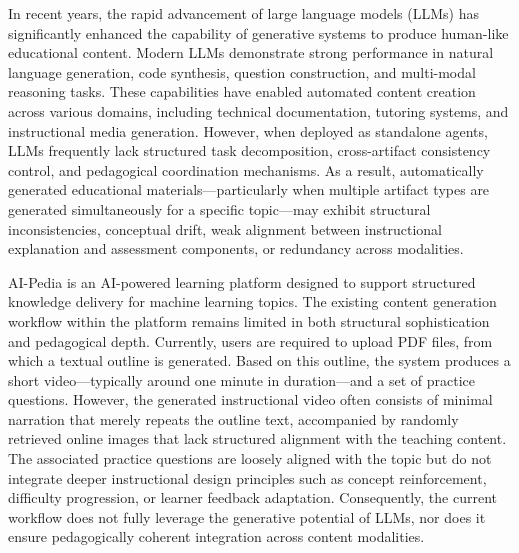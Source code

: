 \documentclass[10pt,journal,compsoc]{IEEEtran}
\begin{document}
\IEEEdisplaynontitleabstractindextext
\IEEEpeerreviewmaketitle

In recent years, the rapid advancement of large language models (LLMs) has significantly enhanced the capability of generative systems to produce human-like educational content. Modern LLMs demonstrate strong performance in natural language generation, code synthesis, question construction, and multi-modal reasoning tasks. These capabilities have enabled automated content creation across various domains, including technical documentation, tutoring systems, and instructional media generation. However, when deployed as standalone agents, LLMs frequently lack structured task decomposition, cross-artifact consistency control, and pedagogical coordination mechanisms. As a result, automatically generated educational materials—particularly when multiple artifact types are generated simultaneously for a specific topic—may exhibit structural inconsistencies, conceptual drift, weak alignment between instructional explanation and assessment components, or redundancy across modalities.

AI-Pedia is an AI-powered learning platform designed to support structured knowledge delivery for machine learning topics. The existing content generation workflow within the platform remains limited in both structural sophistication and pedagogical depth. Currently, users are required to upload PDF files, from which a textual outline is generated. Based on this outline, the system produces a short video—typically around one minute in duration—and a set of practice questions. However, the generated instructional video often consists of minimal narration that merely repeats the outline text, accompanied by randomly retrieved online images that lack structured alignment with the teaching content. The associated practice questions are loosely aligned with the topic but do not integrate deeper instructional design principles such as concept reinforcement, difficulty progression, or learner feedback adaptation. Consequently, the current workflow does not fully leverage the generative potential of LLMs, nor does it ensure pedagogically coherent integration across content modalities.
\end{document}
